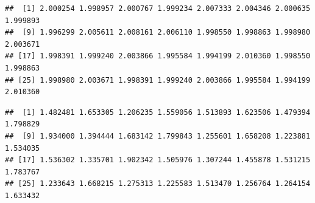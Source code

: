 \documentclass[
]{krantz}
\makeatletter
\newenvironment{Shaded}{\begin{snugshade}}{\end{snugshade}}
\newcommand{\AttributeTok}[1]{\textcolor[rgb]{0.77,0.63,0.00}{#1}}
\newcommand{\CommentTok}[1]{\textcolor[rgb]{0.56,0.35,0.01}{\textit{#1}}}
\newcommand{\DecValTok}[1]{\textcolor[rgb]{0.00,0.00,0.81}{#1}}
\newcommand{\FloatTok}[1]{\textcolor[rgb]{0.00,0.00,0.81}{#1}}
\newcommand{\FunctionTok}[1]{\textcolor[rgb]{0.00,0.00,0.00}{#1}}
\newcommand{\NormalTok}[1]{#1}
\newcommand{\OtherTok}[1]{\textcolor[rgb]{0.56,0.35,0.01}{#1}}
\newcommand{\SpecialCharTok}[1]{\textcolor[rgb]{0.00,0.00,0.00}{#1}}
\newcommand{\StringTok}[1]{\textcolor[rgb]{0.31,0.60,0.02}{#1}}
\newenvironment{kframe}{%
\medskip{}
\setlength{\fboxsep}{.8em}
 \def\at@end@of@kframe{}%
 \ifinner\ifhmode%
  \def\at@end@of@kframe{\end{minipage}}%
  \begin{minipage}{\columnwidth}%
 \fi\fi%
 \def\FrameCommand##1{\hskip\@totalleftmargin \hskip-\fboxsep
 \colorbox{shadecolor}{##1}\hskip-\fboxsep
     \hskip-\linewidth \hskip-\@totalleftmargin \hskip\columnwidth}%
 \MakeFramed {\advance\hsize-\width
   \@totalleftmargin\z@ \linewidth\hsize
   \@setminipage}}%
 {\par\unskip\endMakeFramed%
 \at@end@of@kframe}
\renewenvironment{Shaded}{\begin{kframe}}{\end{kframe}}
\makeatother
\begin{document}
\begin{Shaded}
\end{Shaded}

\begin{verbatim}
##  [1] 2.000254 1.998957 2.000767 1.999234 2.007333 2.004346 2.000635 1.999893
##  [9] 1.996299 2.005611 2.008161 2.006110 1.998550 1.998863 1.998980 2.003671
## [17] 1.998391 1.999240 2.003866 1.995584 1.994199 2.010360 1.998550 1.998863
## [25] 1.998980 2.003671 1.998391 1.999240 2.003866 1.995584 1.994199 2.010360
\end{verbatim}

\begin{Shaded}
\end{Shaded}

\begin{verbatim}
##  [1] 1.482481 1.653305 1.206235 1.559056 1.513893 1.623506 1.479394 1.798829
##  [9] 1.934000 1.394444 1.683142 1.799843 1.255601 1.658208 1.223881 1.534035
## [17] 1.536302 1.335701 1.902342 1.505976 1.307244 1.455878 1.531215 1.783767
## [25] 1.233643 1.668215 1.275313 1.225583 1.513470 1.256764 1.264154 1.633432
\end{verbatim}
\end{document}
